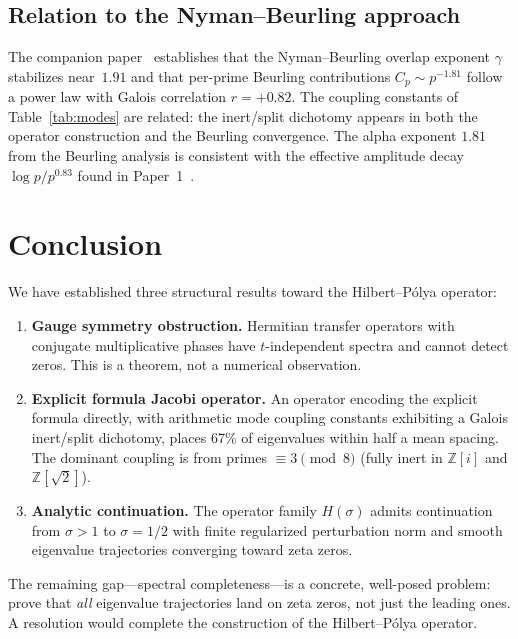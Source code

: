 \documentclass[11pt,a4paper]{article}
\begin{document}
\subsection{Relation to the Nyman--Beurling approach}

The companion paper~\cite{Paper3} establishes that the Nyman--Beurling overlap exponent $\gamma$ stabilizes near~$1.91$ and that per-prime Beurling contributions $C_p \sim p^{-1.81}$ follow a power law with Galois correlation $r = +0.82$.
The coupling constants of Table~\ref{tab:modes} are related: the inert/split dichotomy appears in both the operator construction and the Beurling convergence.
The alpha exponent $1.81$ from the Beurling analysis is consistent with the effective amplitude decay $\log p / p^{0.83}$ found in Paper~1~\cite{Paper1}.

\section{Conclusion}

We have established three structural results toward the Hilbert--P\'olya operator:

\begin{enumerate}[nosep]
\item \textbf{Gauge symmetry obstruction.}
Hermitian transfer operators with conjugate multiplicative phases have $t$-independent spectra and cannot detect zeros.
This is a theorem, not a numerical observation.

\item \textbf{Explicit formula Jacobi operator.}
An operator encoding the explicit formula directly, with arithmetic mode coupling constants exhibiting a Galois inert/split dichotomy, places 67\% of eigenvalues within half a mean spacing.
The dominant coupling is from primes $\equiv 3 \pmod{8}$ (fully inert in $\mathbb{Z}[i]$ and $\mathbb{Z}[\sqrt{2}]$).

\item \textbf{Analytic continuation.}
The operator family $H(\sigma)$ admits continuation from $\sigma > 1$ to $\sigma = 1/2$ with finite regularized perturbation norm and smooth eigenvalue trajectories converging toward zeta zeros.
\end{enumerate}

The remaining gap---spectral completeness---is a concrete, well-posed problem: prove that \emph{all} eigenvalue trajectories land on zeta zeros, not just the leading ones.
A resolution would complete the construction of the Hilbert--P\'olya operator.
\end{document}
